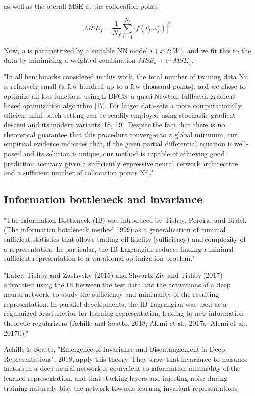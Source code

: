 \documentclass[english]{article}
\begin{document}
as well as the overall MSE at the collocation points

$$MSE_f = \frac{1}{N_f}\sum_{i=1}^{N_f}|f(t_f^i,x_f^i)|^2$$

\item Now, $u$ is parametrized by a suitable NN model $u(x,t;W)$ and we fit this to the data by minimizing a weighted combination $MSE_u +c\cdot MSE_f$.

"In all benchmarks considered in this work, the total number of training
data Nu is relatively small (a few hundred up to a few thousand points), and
we chose to optimize all loss functions using L-BFGS; a quasi-Newton, fullbatch gradient-based optimization algorithm [17]. For larger data-sets a more
computationally efficient mini-batch setting can be readily employed using
stochastic gradient descent and its modern variants [18, 19]. Despite the
fact that there is no theoretical guarantee that this procedure converges to
a global minimum, our empirical evidence indicates that, if the given partial
differential equation is well-posed and its solution is unique, our method is
capable of achieving good prediction accuracy given a sufficiently expressive
neural network architecture and a sufficient number of collocation points Nf ." 
\eitem 



\subsection{Information bottleneck and invariance}
%
\bitem
\item "The Information Bottleneck (IB) was introduced by Tishby, Pereira, and Bialek (The information bottleneck method 1999) as a generalization
of minimal sufficient statistics that allows trading off fidelity (sufficiency) and complexity
of a representation. In particular, the IB Lagrangian reduces finding a minimal sufficient
representation to a variational optimization problem." 

"Later, Tishby and Zaslavsky (2015)
and Shwartz-Ziv and Tishby (2017) advocated using the IB between the test data and the
activations of a deep neural network, to study the sufficiency and minimality of the resulting
representation. In parallel developments, the IB Lagrangian was used as a regularized
loss function for learning representation, leading to new information theoretic regularizers
(Achille and Soatto, 2018; Alemi et al., 2017a; Alemi et al., 2017b)."

\item Achille \& Soatto, "Emergence of Invariance and Disentanglement in Deep Representations", 2018, apply this theory. They show that invariance to nuisance factors in a deep neural network is equivalent to information minimality of the learned representation, and that stacking layers and injecting noise during training naturally bias the network towards learning invariant representations
\end{document}
